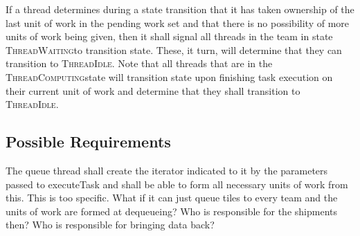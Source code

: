 \documentclass{article}
\newcommand{\ThreadIdle}        {\textsc{ThreadIdle}}
\newcommand{\ThreadComputing}   {\textsc{ThreadComputing}}
\newcommand{\ThreadWaiting}     {\textsc{ThreadWaiting}}
\begin{document}
If a thread determines during a state transition that it has taken ownership of
the last unit of work in the pending work set and that there is no possibility
of more units of work being given, then it shall signal all threads in the team
in state \ThreadWaiting to transition state.  These, it turn, will determine that
they can transition to \ThreadIdle.  Note that all threads that are in the
\ThreadComputing state will transition state upon finishing task execution on
their current unit of work and determine that they shall transition to
\ThreadIdle.\\

\subsection{Possible Requirements}


The queue thread shall create the iterator indicated to it by the parameters
passed to executeTask and shall be able to form all necessary units of work from
this.  This is too specific.  What if it can just queue tiles to every team and
the units of work are formed at dequeueing?  Who is responsible for the
shipments then?  Who is responsible for bringing data back?

\end{document}
